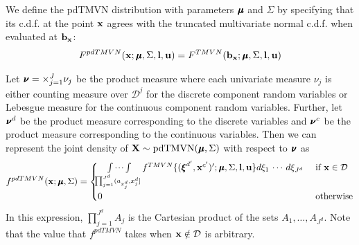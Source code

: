 \documentclass[fleqn]{article}
\begin{document}
We define the pdTMVN distribution with parameters $\bmu$ and $\Sigma$ by specifying that its c.d.f. at the point ${\bf x}$ agrees with the truncated multivariate normal c.d.f. when evaluated at ${\bf b}_{{\bf x}}$:
\begin{align}
F^{pdTMVN}(\bx ; \bmu, \Sigma, \bl, \bu) = F^{TMVN}(\bb_\bx ; \bmu, \Sigma, \bl, \bu) \label{eqn:pdTMVNcdfdefinition}
\end{align}


Let $\bnu = \times_{j = 1}^J \nu_j$ be the product measure where each univariate measure $\nu_j$ is either counting measure over $\mathcal{D}^j$ for the discrete component random variables or Lebesgue measure for the continuous component random variables.  Further, let $\bnu^d$ be the product measure corresponding to the discrete variables and $\bnu^c$ be the product measure corresponding to the continuous variables.  Then we can represent the joint density of $\bX \sim \text{pdTMVN}(\bmu, \Sigma)$ with respect to $\bnu$ as
\begin{align}
f^{pdTMVN}(\bx ; \bmu, \Sigma) = \begin{cases}
\idotsint\limits_{\prod_{j=1}^{J^d} (a_{x^d_{j}}, x^d_{j}]} f^{TMVN}\{({\bxi^{d'}}, {\bx^{c'}})' ; \bmu, \Sigma, \bl, \bu\} d \xi_1 \, \cdots \, d \xi_{J^d} &\text{ if $\bx \in \mathcal{D}$} \\
0 &\text{ otherwise}
\end{cases} \label{eqn:pdTMVNpdfdefinition}
\end{align}
In this expression, $\prod_{j=1}^{J^d} A_j$ is the Cartesian product of the sets $A_1, \ldots, A_{J^d}$.  Note that the value that $f^{pdTMVN}$ takes when ${\bf x} \notin \mathcal{D}$ is arbitrary.
\end{document}
